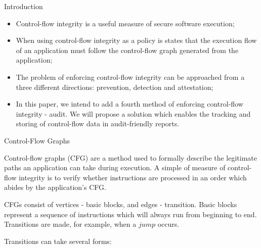 \documentclass[final]{beamer}
\newlength{\onecolwid}
\begin{document}
\begin{frame}[t]
\begin{columns}[t]
\begin{column}{\onecolwid}
\begin{block}{Introduction}
\begin{itemize}
	\item Control-flow integrity is a useful measure of secure software execution; \vspace*{0.4cm}
	\item When using control-flow integrity as a policy is states that the execution flow of an application must follow the control-flow graph generated from the application; \vspace*{0.4cm}
	\item The problem of enforcing control-flow integrity can be approached from a three different directions: prevention, detection and attestation; \vspace*{0.4cm}
	\item In this paper, we intend to add a fourth method of enforcing control-flow integrity - audit. We will propose a solution which enables the tracking and storing of control-flow data in audit-friendly reports.
\end{itemize}

\end{block}


\begin{block}{Control-Flow Graphs}

Control-flow graphs (CFG) are a method used to formally describe the legitimate paths an application can take during execution. A simple of measure of control-flow integrity is to verify whether instructions are processed in an order which abides by the application's CFG.

CFGs consist of vertices - basic blocks, and edges - transition. Basic blocks represent a sequence of instructions which will always run from beginning to end. Transitions are made, for example, when a $jump$ occurs.

Transitions can take several forms:

\end{block}

\end{column} %



\end{columns}
\end{frame}
\end{document}
